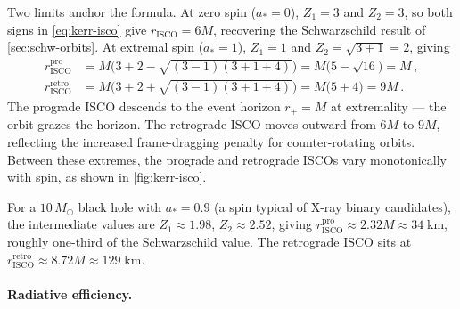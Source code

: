 Two limits anchor the formula.  At zero spin ($a_* = 0$),
$Z_1 = 3$ and $Z_2 = 3$, so both signs in \cref{eq:kerr-isco}
give $r_{\text{ISCO}} = 6M$, recovering the Schwarzschild result
of \cref{sec:schw-orbits}.  At extremal spin ($a_* = 1$),
$Z_1 = 1$ and $Z_2 = \sqrt{3 + 1} = 2$, giving
%
\begin{align}
  r_{\text{ISCO}}^{\text{pro}} &= M
    \bigl(3 + 2 - \sqrt{(3-1)(3+1+4)}\bigr)
    = M\bigl(5 - \sqrt{16}\bigr) = M \,,
    \label{eq:kerr-isco-pro-extremal} \\[3pt]
  r_{\text{ISCO}}^{\text{retro}} &= M
    \bigl(3 + 2 + \sqrt{(3-1)(3+1+4)}\bigr)
    = M\bigl(5 + 4\bigr) = 9M \,.
    \label{eq:kerr-isco-retro-extremal}
\end{align}
%
The prograde ISCO descends to the event horizon $r_+ = M$ at
extremality --- the orbit grazes the horizon.  The retrograde ISCO
moves outward from $6M$ to $9M$, reflecting the increased
frame-dragging penalty for counter-rotating orbits.  Between these
extremes, the prograde and retrograde ISCOs vary monotonically
with spin, as shown in \cref{fig:kerr-isco}.

For a $10\,M_\odot$ black hole with $a_* = 0.9$ (a spin typical of
X-ray binary candidates), the intermediate values are
$Z_1 \approx 1.98$, $Z_2 \approx 2.52$, giving
$r_{\text{ISCO}}^{\text{pro}} \approx 2.32M \approx 34\;\text{km}$,
roughly one-third of the Schwarzschild value.  The retrograde ISCO
sits at $r_{\text{ISCO}}^{\text{retro}} \approx 8.72M \approx
129\;\text{km}$.

\paragraph{Radiative efficiency.}

